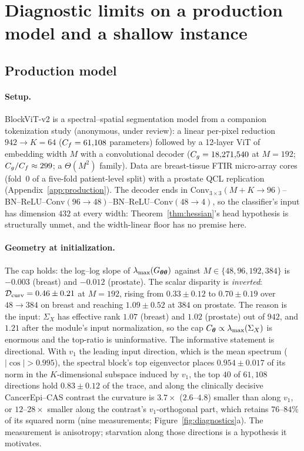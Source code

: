 \section{Diagnostic limits on a production model and a shallow instance}
\label{sec:diagnostics}

\subsection{Production model}
\label{sec:production}

\paragraph{Setup.}
BlockViT-v2 is a spectral--spatial segmentation model from a companion
tokenization study (anonymous, under review): a linear per-pixel reduction
$942\to K=64$ ($C_f=61{,}108$ parameters) followed by a 12-layer ViT of
embedding width $M$ with a convolutional decoder
($C_g=18{,}271{,}540$ at $M=192$; $C_g/C_f\approx299$; a $\Theta(M^2)$
family). Data are breast-tissue FTIR micro-array cores (fold~0 of a
five-fold patient-level split) with a prostate QCL replication
(Appendix~\ref{app:production}). The decoder ends in
$\mathrm{Conv}_{3\times3}(M{+}K\to96)$--BN--ReLU--$\mathrm{Conv}(96\to48)$--BN--ReLU--$\mathrm{Conv}(48\to4)$,
so the classifier's input has dimension $432$ at every width:
Theorem~\ref{thm:hessian}'s head hypothesis is structurally unmet, and the
width-linear floor has no premise here.

\paragraph{Geometry at initialization.}
The cap holds: the log--log slope of $\lambda_{\max}(G_{{\boldsymbol{\theta}}{\boldsymbol{\theta}}})$
against $M\in\{48,96,192,384\}$ is $-0.003$ (breast) and $-0.012$
(prostate). The scalar disparity is \emph{inverted}: $\mathcal{D}_{\mathrm{curv}}=0.46\pm0.21$
at $M=192$, rising from $0.33\pm0.12$ to $0.70\pm0.19$ over $48\to384$ on
breast and reaching $1.09\pm0.52$ at $384$ on prostate. The reason is the
input: $\Sigma_X$ has effective rank $1.07$ (breast) and $1.02$ (prostate)
out of $942$, and $1.21$ after the module's input normalization, so the cap
$C_{\boldsymbol{\theta}}\propto\lambda_{\max}(\Sigma_X)$ is enormous and the top-ratio is
uninformative. The informative statement is directional. With $v_1$ the
leading input direction, which is the mean spectrum ($|\cos|>0.995$), the
spectral block's top eigenvector places $0.954\pm0.017$ of its norm in the
$K$-dimensional subspace induced by $v_1$, the top $40$ of $61{,}108$
directions hold $0.83\pm0.12$ of the trace, and along the clinically
decisive CancerEpi--CAS contrast the curvature is $3.7\times$ ($2.6$--$4.8$)
smaller than along $v_1$, or $12$--$28\times$ smaller along the contrast's
$v_1$-orthogonal part, which retains $76$--$84\%$ of its squared norm
(nine measurements; Figure~\ref{fig:diagnostics}a). The measurement is
anisotropy; starvation along those directions is a hypothesis it motivates.

